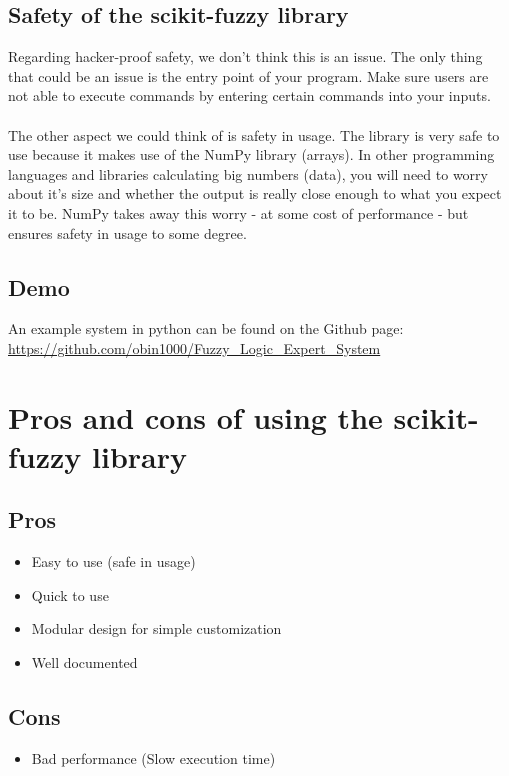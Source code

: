 \documentclass[fleqn,10pt]{SelfArx} %
\begin{document}
\subsection{Safety of the scikit-fuzzy library}
Regarding hacker-proof safety, we don't think this is an issue. The only thing that could be an issue is the entry point of your program. Make sure users are not able to execute commands by entering certain commands into your inputs.\\ \\
The other aspect we could think of is safety in usage. The library is very safe to use because it makes use of the NumPy library (arrays). In other programming languages and libraries calculating big numbers (data), you will need to worry about it's size and whether the output is really close enough to what you expect it to be. NumPy takes away this worry - at some cost of performance - but ensures safety in usage to some degree.

\subsection{Demo}
An example system in python can be found on the Github page: \\
\url{https://github.com/obin1000/Fuzzy_Logic_Expert_System}

\section{Pros and cons of using the scikit-fuzzy library}

\subsection{Pros}
\begin{itemize}
    \item Easy to use (safe in usage)
    \item Quick to use
    \item Modular design for simple customization
    \item Well documented
\end{itemize}
\subsection{Cons}
\begin{itemize}
    \item Bad performance (Slow execution time)
\end{itemize}
\end{document}
